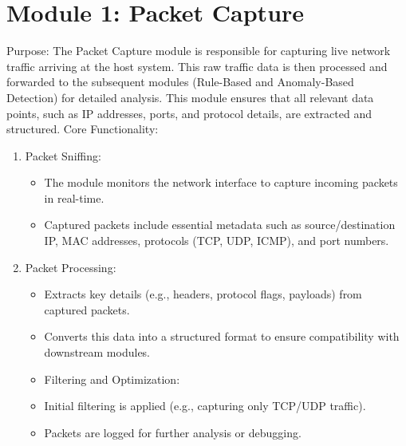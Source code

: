 \documentclass[oneside, english]{reports/assets/sdqtechreport}
\begin{document}
\section{Module 1: Packet Capture}
\label{sec:PacketCapture}
Purpose:
The Packet Capture module is responsible for capturing live network traffic arriving at the host system. This raw traffic data is then processed and forwarded to the subsequent modules (Rule-Based and Anomaly-Based Detection) for detailed analysis. This module ensures that all relevant data points, such as IP addresses, ports, and protocol details, are extracted and structured.
Core Functionality:
\begin{enumerate}
	\item Packet Sniffing:
	\begin{itemize}
   		\item The module monitors the network interface to capture incoming packets in real-time.
   		\item Captured packets include essential metadata such as source/destination IP, MAC addresses, protocols (TCP, UDP, ICMP), and port numbers.
	\end{itemize}
	\item Packet Processing:
	\begin{itemize}
   		\item Extracts key details (e.g., headers, protocol flags, payloads) from captured packets.
   		\item Converts this data into a structured format to ensure compatibility with downstream modules.
	\item Filtering and Optimization:
	\end{itemize}
	\begin{itemize}
   		\item Initial filtering is applied (e.g., capturing only TCP/UDP traffic).
   		\item Packets are logged for further analysis or debugging.
	\end{itemize}
\end{enumerate}
\end{document}
